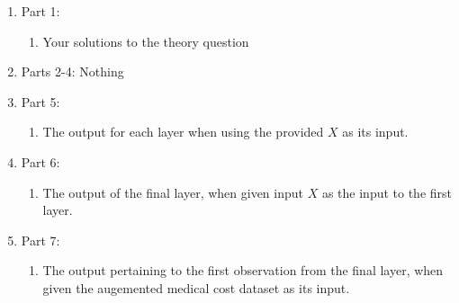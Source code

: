 \documentclass[12pt]{article}
\begin{document}
\begin{enumerate}
\item Part 1:
	\begin{enumerate}
	\item Your solutions to the theory question
	\end{enumerate}
\item Parts 2-4:  Nothing
\item Part 5:
	\begin{enumerate}
	\item The output for each layer when using the provided $X$ as its input.
	\end{enumerate}
\item Part 6:
	\begin{enumerate}
	\item The output of the final layer, when given input $X$ as the input to the first layer.
	\end{enumerate}
\item Part 7:
	\begin{enumerate}
	\item The output pertaining to the first observation from the final layer, when given the augemented medical cost dataset as its input.
	\end{enumerate}
\end{enumerate}
\end{document}
